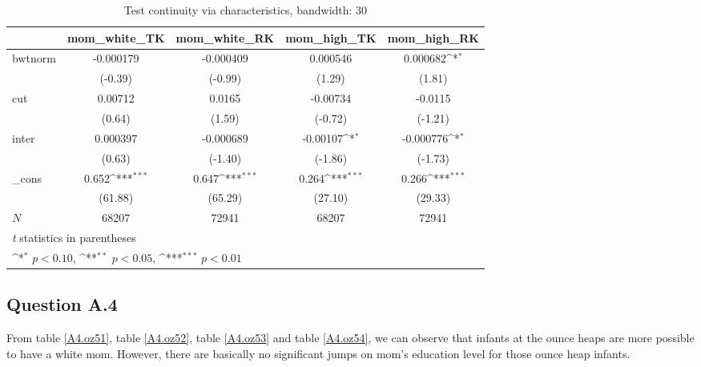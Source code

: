 \documentclass[a4paper,11pt]{article}
\begin{document}
\begin{table}[htbp]\centering
\def\sym#1{\ifmmode^{#1}\else\(^{#1}\)\fi}
\caption{Test continuity via characteristics, bandwidth: 30}
\label{A3.bw30}
\begin{tabular}{l*{4}{c}}
\hline\hline
            &\multicolumn{1}{c}{mom\_white\_TK}&\multicolumn{1}{c}{mom\_white\_RK}&\multicolumn{1}{c}{mom\_high\_TK}&\multicolumn{1}{c}{mom\_high\_RK}\\
\hline
bwtnorm     &   -0.000179         &   -0.000409         &    0.000546         &    0.000682\sym{*}  \\
            &     (-0.39)         &     (-0.99)         &      (1.29)         &      (1.81)         \\
[1em]
cut         &     0.00712         &      0.0165         &    -0.00734         &     -0.0115         \\
            &      (0.64)         &      (1.59)         &     (-0.72)         &     (-1.21)         \\
[1em]
inter       &    0.000397         &   -0.000689         &    -0.00107\sym{*}  &   -0.000776\sym{*}  \\
            &      (0.63)         &     (-1.40)         &     (-1.86)         &     (-1.73)         \\
[1em]
\_cons      &       0.652\sym{***}&       0.647\sym{***}&       0.264\sym{***}&       0.266\sym{***}\\
            &     (61.88)         &     (65.29)         &     (27.10)         &     (29.33)         \\
\hline
\(N\)       &       68207         &       72941         &       68207         &       72941         \\
\hline\hline
\multicolumn{5}{l}{\footnotesize \textit{t} statistics in parentheses}\\
\multicolumn{5}{l}{\footnotesize \sym{*} \(p<0.10\), \sym{**} \(p<0.05\), \sym{***} \(p<0.01\)}\\
\end{tabular}
\end{table}

\subsection*{Question A.4}

From table \ref{A4.oz51}, table \ref{A4.oz52}, table \ref{A4.oz53} and table \ref{A4.oz54}, we can observe that infants at the ounce heaps are more possible to have a white mom. However, there are basically no significant jumps on mom's education level for those ounce heap infants.
\end{document}
